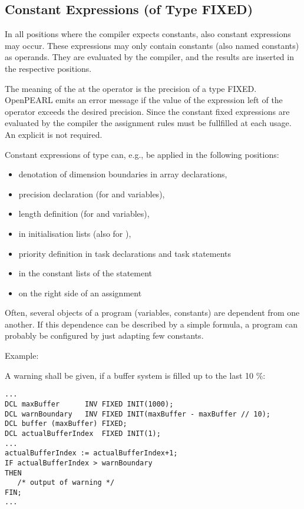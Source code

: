 \subsection{Constant Expressions (of Type FIXED)}   %
\label{sec_const_expression}

In all positions where the compiler expects constants, also constant
expressions may occur. These expressions may only contain constants
(also named constants) as operands. They are evaluated by the compiler,
and the results are inserted in the respective positions.

\begin{grammarframe}




\end{grammarframe}

The meaning of the  at the  operator
is the precision of a type FIXED.
OpenPEARL emits an error message if the value of the expression left of 
the 
operator  exceeds the desired precision.
Since the constant fixed expressions are evaluated by the compiler 
the assignment rules must be fullfilled at each usage. An explicit  
is not required.

Constant expressions of type  can, e.g., be applied in the
following positions:
\begin{itemize}
\item denotation of dimension boundaries in array declarations,
\item precision declaration (for  and  variables),
\item length definition (for  and  variables),
\item in initialisation lists (also for ),
\item priority definition in task declarations and task statements
\item in the constant lists of the  statement
\item on the right side of an assignment
\end{itemize}

Often, several objects of a program (variables, constants) are dependent
from one another. If this dependence can be described by a simple
formula, a program can probably be configured by just adapting few
constants.

Example:

A warning shall be given, if a buffer system is filled up to the last 10
\%:

\begin{lstlisting}
...
DCL maxBuffer      INV FIXED INIT(1000); 
DCL warnBoundary   INV FIXED INIT(maxBuffer - maxBuffer // 10);
DCL buffer (maxBuffer) FIXED;
DCL actualBufferIndex  FIXED INIT(1);
... 
actualBufferIndex := actualBufferIndex+1;
IF actualBufferIndex > warnBoundary 
THEN 
   /* output of warning */ 
FIN;
...
\end{lstlisting}
